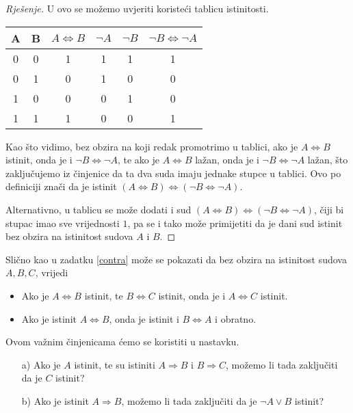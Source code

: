 \begin{proof}[Rješenje]
U ovo se možemo uvjeriti koristeći tablicu istinitosti. 

\begin{center}
\begin{tabular}{ |c|c||c|c|c|c| } 
 \hline
 A & B & $A\Leftrightarrow B$ & $\neg A$ & $\neg B$ & $\neg B\Leftrightarrow \neg A$\\
 \hline \hline
 0 & 0 & 1 & 1 & 1 & 1 \\ 
 0 & 1 & 0 & 1 & 0 & 0 \\ 
 1 & 0 & 0 & 0 & 1 & 0 \\
 1 & 1 & 1 & 0 & 0 & 1 \\
 \hline
\end{tabular}
\end{center}
Kao što vidimo, bez obzira na koji redak promotrimo u tablici, ako je $A\Leftrightarrow B$ istinit, onda je i $\neg B\Leftrightarrow \neg A$, te ako je $A\Leftrightarrow B$ lažan, onda je i $\neg B\Leftrightarrow \neg A$ lažan, što zaključujemo iz činjenice da ta dva suda imaju jednake stupce u tablici. Ovo po definiciji znači da je istinit $(A\Leftrightarrow B)\Leftrightarrow (\neg B\Leftrightarrow \neg A)$. 

Alternativno, u tablicu se može dodati i sud $(A\Leftrightarrow B)\Leftrightarrow (\neg B\Leftrightarrow \neg A)$, čiji bi stupac imao sve vrijednosti $1$, pa se i tako može primijetiti da je dani sud istinit bez obzira na istinitost sudova $A$ i $B$.
\end{proof}
\begin{remark}
\label{equivtransitivity}
Slično kao u zadatku \ref{contra} može se pokazati da bez obzira na istinitost sudova $A,B,C$, vrijedi
\begin{itemize}
\item Ako je $A\Leftrightarrow B$ istinit, te $B\Leftrightarrow C$ istinit, onda je i $A\Leftrightarrow C$ istinit.
\item Ako je istinit $A\Leftrightarrow B$, onda je istinit i $B\Leftrightarrow A$ i obratno.
\end{itemize}
Ovom važnim činjenicama ćemo se koristiti u nastavku.
\end{remark}
\begin{exercise} \textbf{}
\begin{itemize}
\item[a)] Ako je $A$ istinit, te su istiniti $A\Rightarrow B$ i $B\Rightarrow C$, možemo li tada zaključiti da je $C$ istinit?
\item[b)] Ako je istinit $A\Rightarrow B$, možemo li tada zaključiti da je $\neg A\vee B$ istinit?
\end{itemize}
\end{exercise}
